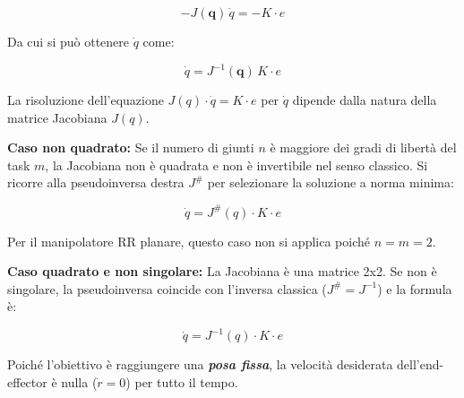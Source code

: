 \documentclass[11pt, a4paper]{article}
\begin{document}
\label{H_29de}
\[
    -J(\mathbf{q})\,\dot{q} = -K \cdot e
\]

\begin{par}
\begin{flushleft}
Da cui si può ottenere $\dot{q}$ come:
\end{flushleft}
\end{par}

\label{H_351f}
\[
    \dot{q} = J^{-1}(\mathbf{q})\,K \cdot e
\]

\begin{par}
\begin{flushleft}
La risoluzione dell'equazione $J(q)\cdot \dot{q} =K\cdot e$ per $\dot{q}$ dipende dalla natura della matrice Jacobiana $J(q)$.
\end{flushleft}
\end{par}

\begin{par}
\begin{flushleft}
\textbf{Caso non quadrato:} Se il numero di giunti $n$ è maggiore dei gradi di libertà del task $m$, la Jacobiana non è quadrata e non è invertibile nel senso classico. Si ricorre alla pseudoinversa destra $J^{\#}$ per selezionare la soluzione a norma minima:
\end{flushleft}
\end{par}

\label{H_4e5b}
\[
    \dot{q} = J^{\#}(q) \cdot K \cdot e
\]

\begin{par}
\begin{flushleft}
Per il manipolatore RR planare, questo caso non si applica poiché $n=m=2$.
\end{flushleft}
\end{par}

\newpage
\begin{par}
\begin{flushleft}
\textbf{Caso quadrato e non singolare:} La Jacobiana è una matrice 2x2. Se non è singolare, la pseudoinversa coincide con l'inversa classica ($J^{\#} =J^{-1}$) e la formula è:
\end{flushleft}
\end{par}
\[
    \dot{q} = J^{-1}(q) \cdot K \cdot e
\]
\begin{par}
\begin{flushleft}
Poiché l'obiettivo è raggiungere una \textit{\textbf{posa fissa}}, la velocità desiderata dell'end-effector è nulla ($\dot{r} =0$) per tutto il tempo.
\end{flushleft}
\end{par}
\end{document}
